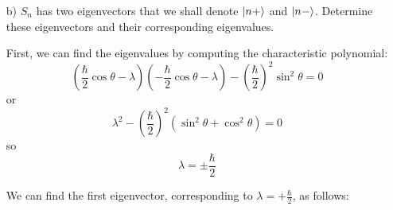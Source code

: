 \documentclass[a4paper,twoside]{article}
\begin{document}
\begin{itemize}
    \item[b)] $S_n$ has two eigenvectors that we shall denote $\ket{n+}$ and $\ket{n-}$. Determine these eigenvectors and their corresponding eigenvalues.

\begin{tcolorbox}
    First, we can find the eigenvalues by computing the characteristic polynomial:
    \begin{equation}
        \left(\frac{\hbar}{2}\cos\theta-\lambda\right)\left(-\frac{\hbar}{2}\cos\theta-\lambda\right)-\left(\frac{\hbar}{2}\right)^2\sin^2\theta = 0
    \end{equation}
    or
    \begin{equation}
        \lambda^2-\left(\frac{\hbar}{2}\right)^2\left(\sin^2\theta + \cos^2\theta  \right) = 0 
    \end{equation}
    so
    \begin{equation}
        \lambda = \pm\frac{\hbar}{2}
    \end{equation}

    We can find the first eigenvector, corresponding to $\lambda = +\frac{\hbar}{2}$, as follows:


\end{tcolorbox}
\end{itemize}
\end{document}
